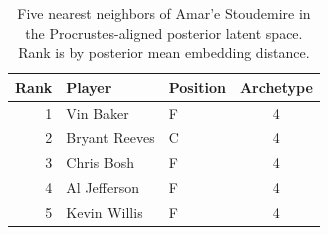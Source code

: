 \begin{table}[htbp]
  \centering\small
  \begin{tabular}{rllc}
    \toprule
    Rank & Player & Position & Archetype \\
    \midrule
    1 & Vin Baker & F & 4 \\
    2 & Bryant Reeves & C & 4 \\
    3 & Chris Bosh & F & 4 \\
    4 & Al Jefferson & F & 4 \\
    5 & Kevin Willis & F & 4 \\
    \bottomrule
  \end{tabular}
  \caption{Five nearest neighbors of Amar'e Stoudemire in the Procrustes-aligned posterior latent space. Rank is by posterior mean embedding distance.}
  \label{tab:Amar_e_Stoudemire_neighbors}
\end{table}

